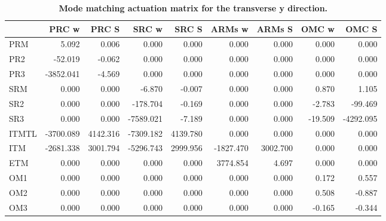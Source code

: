 \begin{table}
	\centering
	\begin{tabular}{|l||r|r|r|r|r|r|r|r|}
		\hline
		{} &     PRC w &    PRC S &     SRC w &    SRC S &    ARMs w &   ARMs S &   OMC w &     OMC S \\
		\hline
		\hline
		PRM   &     5.092 &    0.006 &     0.000 &    0.000 &     0.000 &    0.000 &   0.000 &     0.000 \\
		PR2   &   -52.019 &   -0.062 &     0.000 &    0.000 &     0.000 &    0.000 &   0.000 &     0.000 \\
		PR3   & -3852.041 &   -4.569 &     0.000 &    0.000 &     0.000 &    0.000 &   0.000 &     0.000 \\
		SRM   &     0.000 &    0.000 &    -6.870 &   -0.007 &     0.000 &    0.000 &   0.870 &     1.105 \\
		SR2   &     0.000 &    0.000 &  -178.704 &   -0.169 &     0.000 &    0.000 &  -2.783 &   -99.469 \\
		SR3   &     0.000 &    0.000 & -7589.021 &   -7.189 &     0.000 &    0.000 & -19.509 & -4292.095 \\
		ITMTL & -3700.089 & 4142.316 & -7309.182 & 4139.780 &     0.000 &    0.000 &   0.000 &     0.000 \\
		ITM   & -2681.338 & 3001.794 & -5296.743 & 2999.956 & -1827.470 & 3002.700 &   0.000 &     0.000 \\
		ETM   &     0.000 &    0.000 &     0.000 &    0.000 &  3774.854 &    4.697 &   0.000 &     0.000 \\
		OM1   &     0.000 &    0.000 &     0.000 &    0.000 &     0.000 &    0.000 &   0.172 &     0.557 \\
		OM2   &     0.000 &    0.000 &     0.000 &    0.000 &     0.000 &    0.000 &   0.508 &    -0.887 \\
		OM3   &     0.000 &    0.000 &     0.000 &    0.000 &     0.000 &    0.000 &  -0.165 &    -0.344 \\
		\hline
	\end{tabular}
	\caption[Mode matching actuation matrix for the transverse y direction.]
	{\textbf{Mode matching actuation matrix for the transverse y direction.} }
	\label{tbl:y_act_matrix}
\end{table}


